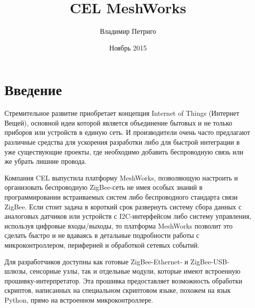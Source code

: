 \documentclass[12pt]{article}
\title{CEL MeshWorks}
\author{Владимир Петриго}
\date{Ноябрь 2015}
\begin{document}
\maketitle

\section{Введение}

Стремительное развитие приобретает концепция Internet of Things (Интернет Вещей),
основной идеи которой является объединение бытовых и не только приборов или 
устройств в единую сеть. И производители очень часто предлагают различные 
средства для ускорения разработки либо для быстрой интеграции в уже существующие 
проекты, где необходимо добавить беспроводную связь или же убрать лишние провода.

Компания CEL выпустила платформу MeshWorks, позволяющую настроить и организовать 
беспроводную ZigBee-сеть не имея особых знаний в программировании встраиваемых систем
либо беспроводного стандарта связи ZigBee. Если стоит задача в короткий срок развернуть
систему сбора данных с аналоговых датчиков или устройств с I2C-интерфейсом либо 
систему управления, используя цифровые входы/выходы, то платформа MeshWorks позволит
это сделать быстро и не вдаваясь в детальные подробности работы с микроконтроллером, 
периферией и обработкой сетевых событий.

Для разработчиков доступны как готовые ZigBee-Ethernet- и ZigBee-USB-шлюзы, 
сенсорные узлы, так и отдельные модули, которые имеют встроенную 
прошивку-интерпретатор. Эта прошивка предоставляет возможность обработки скриптов, 
написанных на специальном скриптовом языке, похожем на язык Python, прямо на 
встроенном микроконтроллере. 
\end{document}
